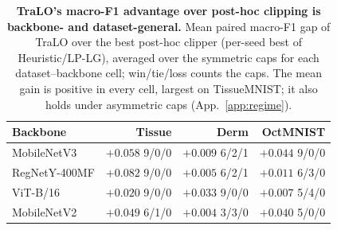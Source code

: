 \begin{table}[t]\centering\small
\setlength{\tabcolsep}{4.5pt}
\caption{\textbf{TraLO's macro-F1 advantage over post-hoc clipping is backbone- and
dataset-general.} Mean paired macro-F1 gap of TraLO over the best post-hoc clipper (per-seed
best of Heuristic/LP-LG), averaged over the symmetric caps for each dataset--backbone cell;
{\scriptsize win/tie/loss} counts the caps. The mean gain is positive in every cell, largest on
TissueMNIST; it also holds under asymmetric caps (App.~\ref{app:regime}).}
\label{tab:deploybb}
\begin{tabular}{l rrr}
\toprule
Backbone & Tissue & Derm & OctMNIST \\
\midrule
MobileNetV3    & $+0.058$ {\scriptsize 9/0/0} & $+0.009$ {\scriptsize 6/2/1} & $+0.044$ {\scriptsize 9/0/0} \\
RegNetY-400MF  & $+0.082$ {\scriptsize 9/0/0} & $+0.005$ {\scriptsize 6/2/1} & $+0.011$ {\scriptsize 6/3/0} \\
ViT-B/16       & $+0.020$ {\scriptsize 9/0/0} & $+0.033$ {\scriptsize 9/0/0} & $+0.007$ {\scriptsize 5/4/0} \\
MobileNetV2    & $+0.049$ {\scriptsize 6/1/0} & $+0.004$ {\scriptsize 3/3/0} & $+0.040$ {\scriptsize 5/0/0} \\
\bottomrule
\end{tabular}
\end{table}
